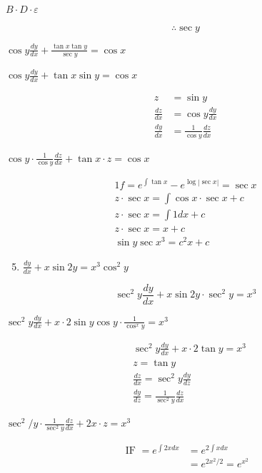 \documentclass[10pt]{article}
\begin{document}
$B \cdot D \cdot \varepsilon$

$$
\therefore \sec y
$$

$\cos y \frac{d y}{d x}+\frac{\tan x \tan y}{\sec y}=\cos x$

$\cos y \frac{d y}{d x}+\tan x \sin y=\cos x$

$$
\begin{aligned}
z & =\sin y \\
\frac{d z}{d x} & =\cos y \frac{d y}{d x} \\
\frac{d y}{d x} & =\frac{1}{\cos y} \frac{d z}{d x}
\end{aligned}
$$

$\cos y \cdot \frac{1}{\cos y} \frac{d z}{d x}+\tan x \cdot z=\cos x$

$$
\begin{gathered}
1 f=e^{\int \tan x}-e^{\log |\sec x|}=\sec x \\
z \cdot \sec x=\int \cos x \cdot \sec x+c \\
z \cdot \sec x=\int 1 d x+c \\
z \cdot \sec x=x+c \\
\sin y \sec x^{3}=c^{2} x+c
\end{gathered}
$$

\begin{enumerate}
  \setcounter{enumi}{4}
  \item $\frac{d y}{d x}+x \sin 2 y=x^{3} \cos ^{2} y$
\end{enumerate}

$$
\sec ^{2} y \frac{d y}{d x}+x \sin 2 y \cdot \sec ^{2} y=x^{3}
$$

$\sec ^{2} y \frac{d y}{d x}+x \cdot 2 \sin y \cos y \cdot \frac{1}{\cos ^{x} y}=x^{3}$

$$
\begin{aligned}
& \sec ^{2} y \frac{d y}{d x}+x \cdot 2 \tan y=x^{3} \\
& z=\tan y \\
& \frac{d z}{d x}=\sec ^{2} y \frac{d y}{d z} \\
& \frac{d y}{d z}=\frac{1}{\sec ^{2} y} \frac{d z}{d x}
\end{aligned}
$$

$\sec ^{2} / y \cdot \frac{1}{\sec ^{2} y} \frac{d z}{d x}+2 x \cdot z=x^{3}$

$$
\begin{aligned}
\text { IF }=e^{\int 2 x d x} & =e^{2 \int x d x} \\
& =e^{2 x^{2} / 2}=e^{x^{2}}
\end{aligned}
$$
\end{document}
